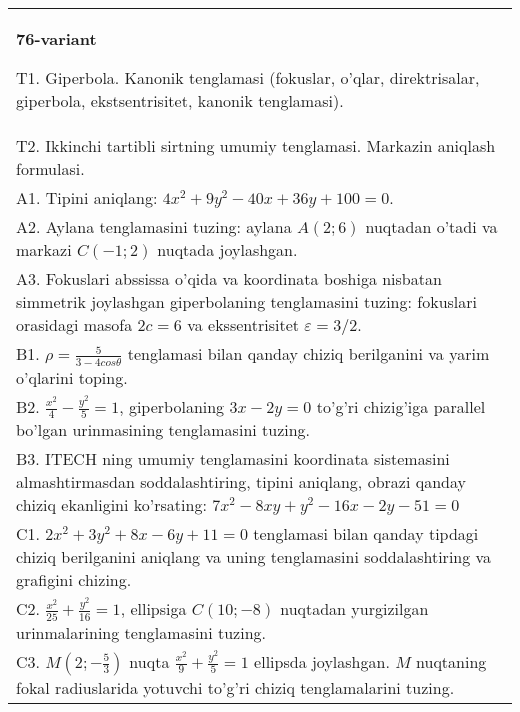 \documentclass{article}
\begin{document}
\begin{tabular}{m{17cm}}
\textbf{76-variant}
\newline

T1. Giperbola. Kanonik tenglamasi (fokuslar, o'qlar, direktrisalar, giperbola, ekstsentrisitet, kanonik tenglamasi).\\

T2. Ikkinchi tartibli sirtning umumiy tenglamasi. Markazin aniqlash formulasi.\\

A1. Tipini aniqlang: $4x^2+9y^2-40x+36y+100=0$.\\

A2. Aylana tenglamasini tuzing: aylana $A(2;6)$ nuqtadan o'tadi va markazi $C(-1;2)$ nuqtada joylashgan.\\

A3. Fokuslari abssissa o'qida va koordinata boshiga nisbatan simmetrik joylashgan giperbolaning tenglamasini tuzing: fokuslari orasidagi masofa $2c=6$ va ekssentrisitet $\varepsilon=3/2$.\\

B1. $\rho = \frac{5}{3 - 4cos\theta}$ tenglamasi bilan qanday chiziq berilganini va yarim o'qlarini toping.  \\

B2. $\frac{x^{2}}{4} - \frac{y^{2}}{5} = 1$, giperbolaning $3x - 2y = 0$ to'g'ri chizig'iga parallel bo'lgan urinmasining tenglamasini tuzing.  \\

B3. ITECH ning umumiy tenglamasini koordinata sistemasini almashtirmasdan soddalashtiring, tipini aniqlang, obrazi qanday chiziq ekanligini ko'rsating: $7x^{2} - 8xy + y^{2} - 16x - 2y - 51 = 0$\\

C1. $2x^{2} + 3y^{2} + 8x - 6y + 11 = 0$ tenglamasi bilan qanday tipdagi chiziq berilganini aniqlang va uning tenglamasini soddalashtiring va grafigini chizing.  \\

C2. $\frac{x^{2}}{25} + \frac{y^{2}}{16} = 1$, ellipsiga $C(10; - 8)$ nuqtadan yurgizilgan urinmalarining tenglamasini tuzing.  \\

C3. $M(2; - \frac{5}{3})$ nuqta $\frac{x^{2}}{9} + \frac{y^{2}}{5} = 1$ ellipsda joylashgan. $M$ nuqtaning fokal radiuslarida yotuvchi to'g'ri chiziq tenglamalarini tuzing.  \\

\end{tabular}
\vspace{1cm}
\end{document}
